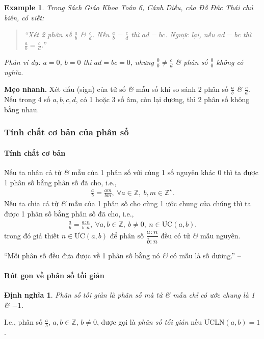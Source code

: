 \documentclass{article}
\numberwithin{equation}{section}
\newtheorem{dinhnghia}{Định nghĩa}[section]
\newtheorem{example}{Example}[section]
\begin{document}
\begin{example}
	Trong Sách Giáo Khoa Toán 6, Cánh Diều, của Đỗ Đức Thái chủ biên, có viết:
	\begin{quotation}
		``Xét 2 phân số $\frac{a}{b}$ \textit{\&} $\frac{c}{d}$. Nếu $\frac{a}{b} = \frac{c}{d}$ thì $ad = bc$. Ngược lại, nếu $ad = bc$ thì $\frac{a}{b} = \frac{c}{d}$.''
	\end{quotation}
	Phản ví dụ: $a = 0$, $b = 0$ thì $ad = bc = 0$, nhưng $\frac{0}{0}\ne\frac{c}{d}$ \textit{\&} phân số $\frac{0}{0}$ không có nghĩa.
\end{example}
\textbf{Mẹo nhanh.} Xét dấu (sign) của tử số \textit{\&} mẫu số khi so sánh 2 phân số $\frac{a}{b}$ \textit{\&} $\frac{c}{d}$. Nếu trong 4 số $a,b,c,d$, có 1 hoặc 3 số âm, còn lại dương, thì 2 phân số không bằng nhau.

\subsubsection{Tính chất cơ bản của phân số}

\paragraph{Tính chất cơ bản}
Nếu ta nhân cả tử \textit{\&} mẫu của 1 phân số với cùng 1 số nguyên khác 0 thì ta được 1 phân số bằng phân số đã cho, i.e.,
\begin{align*}
	\frac{a}{b} = \frac{am}{bm},\ \forall a\in\mathbb{Z},\ b,m\in\mathbb{Z}^\star.
\end{align*}
Nếu ta chia cả tử \textit{\&} mẫu của 1 phân số cho cùng 1 ước chung của chúng thì ta được 1 phân số bằng phân số đã cho, i.e.,
\begin{align*}
	\frac{a}{b} = \frac{a:n}{b:n},\ \forall a,b\in\mathbb{Z},\ b\ne 0,\ n\in\mbox{ƯC}(a,b).
\end{align*}
trong đó giả thiết $n\in\mbox{ƯC}(a,b)$ để phân số $\dfrac{a:n}{b:n}$ đều có tử \textit{\&} mẫu nguyên.

``Mỗi phân số đều đưa được về 1 phân số bằng nó \textit{\&} có mẫu là số dương.'' -- \cite[p. 28]{SGK_Toan_6_Canh_Dieu_tap_2}

\paragraph{Rút gọn về phân số tối giản}
\begin{dinhnghia}
	\emph{Phân số tối giản} là phân số mà tử \textit{\&} mẫu chỉ có ước chung là 1 \textit{\&} $-1$.
\end{dinhnghia}
I.e., phân số $\frac{a}{b}$, $a,b\in\mathbb{Z}$, $b\ne 0$, được gọi là \emph{phân số tối giản} nếu $\mbox{ƯCLN}(a,b) = 1$.
\end{document}
